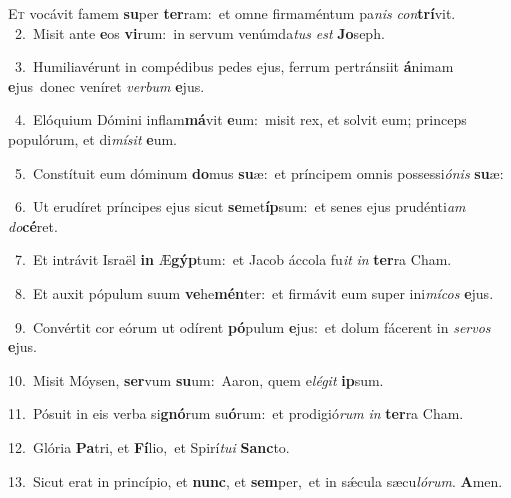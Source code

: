 \lettrine{\initial\textcolor{\initialcolor}{E}}{t} vocávit famem \textbf{su}\-per \textbf{ter}\-ram:~\star et omne firmaméntum pa\textit{nis} \textit{con}\-\textbf{trí}vit.\\
{\numbfont\textcolor{\numbcolor}{~2.}}~Misit ante \textbf{e}\-os \textbf{vi}\-rum:~\star in servum venúmda\textit{tus} \textit{est} \textbf{Jo}\-seph.\par
{\numbfont\textcolor{\numbcolor}{~3.}}~Humiliavérunt in compédibus pedes ejus, ferrum pertránsiit \textbf{á}\-nimam \textbf{e}\-jus~\star donec veníret \textit{ver}\-\textit{bum} \textbf{e}\-jus.\par
{\numbfont\textcolor{\numbcolor}{~4.}}~Elóquium Dómini inflam\-\textbf{má}\-vit \textbf{e}\-um:~\star misit rex, et solvit eum; princeps populórum, et di\-\textit{mí}\-\textit{sit} \textbf{e}\-um.\par
{\numbfont\textcolor{\numbcolor}{~5.}}~Constítuit eum dóminum \textbf{do}\-mus \textbf{su}\-æ:~\star et príncipem omnis possessi\-\textit{ó}\-\textit{nis} \textbf{su}\-æ:\par
{\numbfont\textcolor{\numbcolor}{~6.}}~Ut erudíret príncipes ejus sicut \textbf{se}\-met\-\textbf{íp}\-sum:~\star et senes ejus prudénti\textit{am} \textit{do}\-\textbf{cé}ret.\par
{\numbfont\textcolor{\numbcolor}{~7.}}~Et intrávit Israël \textbf{in} Æ\-\textbf{gýp}\-tum:~\star et Jacob áccola fu\textit{it} \textit{in} \textbf{ter}\-ra Cham.\par
{\numbfont\textcolor{\numbcolor}{~8.}}~Et auxit pópulum suum \textbf{ve}\-he\-\textbf{mén}\-ter:~\star et firmávit eum super ini\-\textit{mí}\-\textit{cos} \textbf{e}\-jus.\par
{\numbfont\textcolor{\numbcolor}{~9.}}~Convértit cor eórum ut odírent \textbf{pó}\-pulum \textbf{e}\-jus:~\star et dolum fácerent in \textit{ser}\-\textit{vos} \textbf{e}\-jus.\par
{\numbfont\textcolor{\numbcolor}{10.}}~Misit Móysen, \textbf{ser}\-vum \textbf{su}\-um:~\star Aaron, quem e\-\textit{lé}\-\textit{git} \textbf{ip}\-sum.\par
{\numbfont\textcolor{\numbcolor}{11.}}~Pósuit in eis verba si\-\textbf{gnó}\-rum su\-\textbf{ó}\-rum:~\star et prodigió\textit{rum} \textit{in} \textbf{ter}\-ra Cham.\par
{\numbfont\textcolor{\numbcolor}{12.}}~Glória \textbf{Pa}\-tri, et \textbf{Fí}\-lio,~\star et Spirí\-\textit{tu}\-\textit{i} \textbf{Sanc}\-to.\par
{\numbfont\textcolor{\numbcolor}{13.}}~Sicut erat in princípio, et \textbf{nunc}\-, et \textbf{sem}\-per,~\star et in sǽcula sæcu\-\textit{ló}\-\textit{rum}. \textbf{A}\-men.\par
